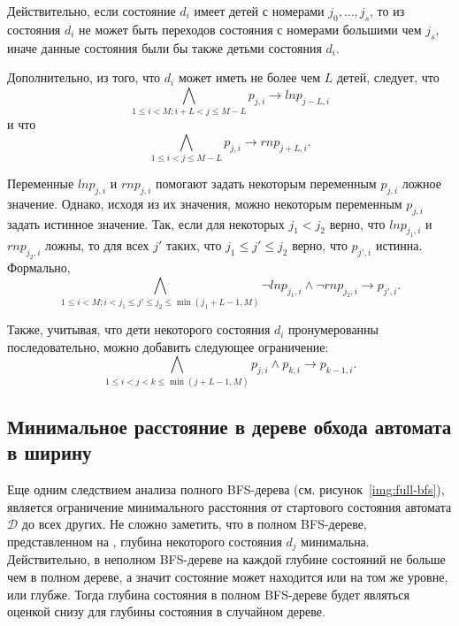 Действительно, если состояние $d_{i}$ имеет детей с номерами $j_{0},\ldots,j_{s}$, то из состояния $d_{i}$ не может быть переходов состояния с номерами б\emph{о}льшими чем $j_{s}$, иначе данные состояния были бы также детьми состояния $d_{i}$. 

Дополнительно, из того, что $d_{i}$ может иметь не более чем $L$ детей, следует, что
\begin{equation*}
\bigwedge_{1 \leq i < M; i + L < j \leq M - L} p_{j,i} \rightarrow \mathit{lnp}_{j - L, i}
\end{equation*}
и что
\begin{equation*}
\bigwedge_{1 \leq i < j \leq M - L} p_{j,i} \rightarrow \mathit{rnp}_{j + L, i}.
\end{equation*}


Переменные $\mathit{lnp}_{j,i}$ и $\mathit{rnp}_{j,i}$ помогают задать некоторым переменным $p_{j,i}$ ложное значение.
Однако, исходя из их значения, можно некоторым переменным $p_{j,i}$ задать истинное значение.
Так, если для некоторых $j_{1} < j_{2}$ верно, что $\mathit{lnp}_{j_{1}, i}$ и $\mathit{rnp}_{j_{2}, i}$ ложны, то для всех $j'$ таких, что $j_{1} \leq j' \leq j_{2}$ верно, что $p_{j',i}$ истинна.
Формально,
\begin{equation*}
\bigwedge_{1 \leq i < M;i < j_{1} \leq j' \leq j_{2} \leq \min\left(j_{1} + L - 1, M\right)} \neg \mathit{lnp}_{j_{1},i} \wedge \neg \mathit{rnp}_{j_{2},i} \rightarrow p_{j',i}.
\end{equation*}


Также, учитывая, что дети некоторого состояния $d_{i}$ пронумерованны последовательно, можно добавить следующее ограничение:
\begin{equation*}
\bigwedge_{1 \leq i < j < k \leq \min(j + L - 1, M)} p_{j,i} \wedge p_{k,i} \rightarrow p_{k - 1, i}.
\end{equation*}



\subsection{Минимальное расстояние в дереве обхода автомата в ширину}
\label{sec:space:pruning:bfs-distance}

Еще одним следствием анализа полного BFS-дерева (см. рисунок~\ref{img:full-bfs}), является ограничение минимального расстояния от стартового состояния автомата $\mathcal{D}$ до всех других.
Не сложно заметить, что в полном BFS-дереве, представленном на , глубина некоторого состояния $d_{j}$ минимальна.
Действительно, в неполном BFS-дереве на каждой глубине состояний не больше чем в полном дереве, а значит состояние может находится или на том же уровне, или глубже. 
Тогда глубина состояния в полном BFS-дереве будет являться оценкой снизу для глубины состояния в случайном дереве.

